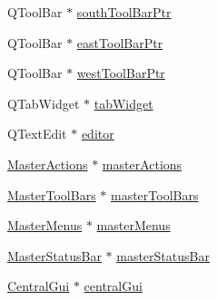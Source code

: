\begin{DoxyCompactItemize}
Q\-Tool\-Bar $\ast$ \hyperlink{class_master_gui_a4a0234ba347ba345e79eff8c19ba27c8}{south\-Tool\-Bar\-Ptr}
\item 
Q\-Tool\-Bar $\ast$ \hyperlink{class_master_gui_a289b4db70744b812566a689bf368c37c}{east\-Tool\-Bar\-Ptr}
\item 
Q\-Tool\-Bar $\ast$ \hyperlink{class_master_gui_ad8bf561c56063077e97f9a993fa38ee4}{west\-Tool\-Bar\-Ptr}
\item 
Q\-Tab\-Widget $\ast$ \hyperlink{class_master_gui_a3bca8bd4cc4ecef70de27afff52a7b08}{tab\-Widget}
\item 
Q\-Text\-Edit $\ast$ \hyperlink{class_master_gui_a0681f0b3d1828d84c0c0cd7e4d765d98}{editor}
\item 
\hyperlink{class_master_actions}{Master\-Actions} $\ast$ \hyperlink{class_master_gui_a85dc72333d336db18a92207a09db4ce3}{master\-Actions}
\item 
\hyperlink{class_master_tool_bars}{Master\-Tool\-Bars} $\ast$ \hyperlink{class_master_gui_afb90e8f19dae43cb78c8495e5708e68b}{master\-Tool\-Bars}
\item 
\hyperlink{class_master_menus}{Master\-Menus} $\ast$ \hyperlink{class_master_gui_a27f793278e486a5bfec69ef366199e5d}{master\-Menus}
\item 
\hyperlink{class_master_status_bar}{Master\-Status\-Bar} $\ast$ \hyperlink{class_master_gui_a69899e3a9712e70d91f42b9d8ba2bd22}{master\-Status\-Bar}
\item 
\hyperlink{class_central_gui}{Central\-Gui} $\ast$ \hyperlink{class_master_gui_a565fc5a3622b8b5417b26dd1306439b8}{central\-Gui}
\end{DoxyCompactItemize}


